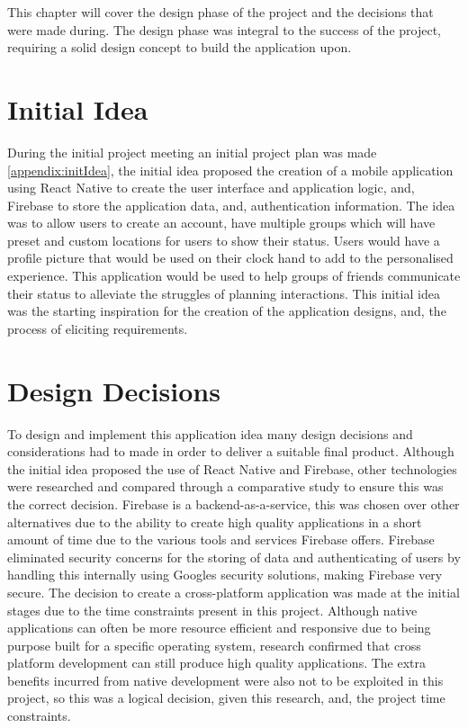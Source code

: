 This chapter will cover the design phase of the project and the decisions  that were made during. The design phase was integral to the success of the project, requiring a solid design concept to build the application upon.

\section{Initial Idea}
During the initial project meeting an initial project plan was made \ref{appendix:initIdea}, the initial idea proposed the creation of a mobile application using React Native \cite{reactnative} to create the user interface and application logic, and, Firebase \cite{firebase} to store the application data, and, authentication information. The idea was to allow users to create an account, have multiple groups which will have preset and custom locations for users to show their status. Users would have a profile picture that would be used on their clock hand to add to the personalised experience. This application would be used to help groups of friends communicate their status to alleviate the struggles of planning interactions. This initial idea was the starting inspiration for the creation of the application designs, and, the process of eliciting requirements.

\section{Design Decisions}\label{designDecis}
To design and implement this application idea many design decisions and considerations had to made in order to deliver a suitable final product. Although the initial idea proposed the use of React Native and Firebase, other technologies were researched and compared through a comparative study \cite{compStudy} to ensure this was the correct decision. Firebase is a backend-as-a-service, this was chosen over other alternatives due to the ability to create high quality applications in a short amount of time due to the various tools and services Firebase offers. Firebase eliminated security concerns for the storing of data and authenticating of users by handling this internally using Googles security solutions, making Firebase very secure. The decision to create a cross-platform application was made at the initial stages due to the time constraints present in this project. Although native applications can often be more resource efficient and responsive due to being purpose built for a specific operating system, research confirmed that cross platform development can still produce high quality applications. The extra benefits incurred from native development were also not to be exploited in this project, so this was a logical decision, given this research, and, the project time constraints.

